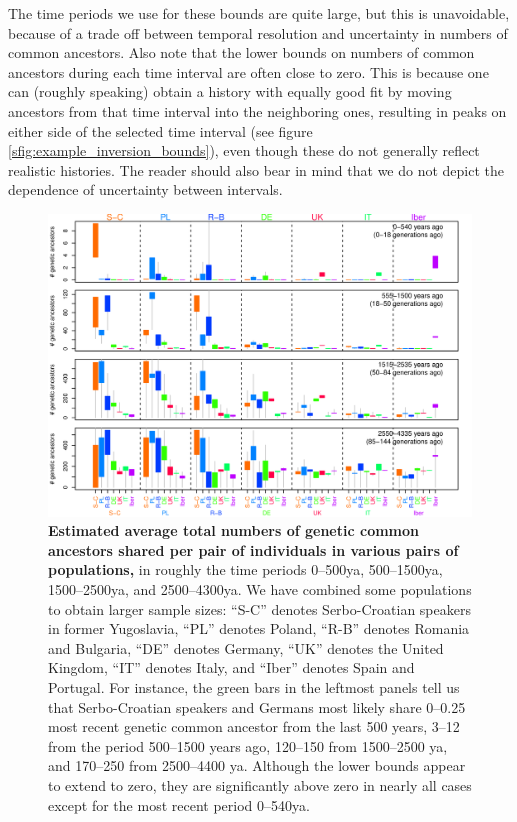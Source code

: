 \documentclass{article}
\begin{document}
The time periods we use for these bounds are quite large, but this is unavoidable,
because of a trade off between temporal resolution and uncertainty in numbers of common ancestors.
Also note that the lower bounds on numbers of common ancestors during each time
interval are often close to zero.
This is because one can (roughly speaking) obtain a history with equally good fit
by moving ancestors from that time interval into the neighboring ones, 
resulting in peaks on either side of the selected time interval (see figure \ref{sfig:example_inversion_bounds}),
even though these do not generally reflect realistic histories.
The reader should also bear in mind that 
we do not depict the dependence of uncertainty between intervals.

\begin{figure}[!htp]
  \begin{center}
    \includegraphics{inversion-boxplots}
    \caption{
    {\bf Estimated average total numbers of genetic common ancestors shared per pair of individuals in various pairs of populations,}
    in roughly the time periods 0--500ya, 500--1500ya, 1500--2500ya, and 2500--4300ya.
    We have combined some populations to obtain larger sample sizes:
    ``S-C'' denotes Serbo-Croatian speakers in former Yugoslavia,
    ``PL'' denotes Poland,
    ``R-B'' denotes Romania and Bulgaria,
    ``DE'' denotes Germany,
    ``UK'' denotes the United Kingdom,
    ``IT'' denotes Italy,
    and ``Iber'' denotes Spain and Portugal.
    For instance, the green bars in the leftmost panels tell us that 
    Serbo-Croatian speakers and Germans most likely share 0--0.25 most recent genetic common ancestor from the last 500 years,
    3--12 from the period 500--1500 years ago, 
    120--150 from 1500--2500 ya, and 170--250 from 2500--4400 ya.
    Although the lower bounds appear to extend to zero,
    they are significantly above zero in nearly all cases
    except for the most recent period 0--540ya.  \label{fig:inversion_boxplots}
    }
  \end{center}
\end{figure}
\end{document}
